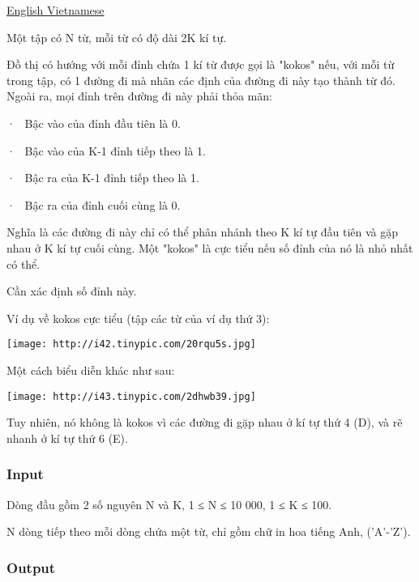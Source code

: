 



\href{/problems/show/MKOKOS/en/}{       English      }\href{/problems/show/MKOKOS/vn/}{       Vietnamese      }



   Một tập có N từ, mỗi từ có độ dài 2K kí tự.   


   Đồ thị có hướng với mỗi đỉnh chứa 1 kí từ được gọi là "kokos" nếu, với mỗi từ trong tập, có 1 đường đi mà nhãn các định của đường đi này tạo thành từ đó. Ngoài ra, mọi đỉnh trên đường đi này phải thỏa mãn:  

   ·  Bậc vào của đỉnh đầu tiên là 0.   


   ·  Bậc vào của K-1 đỉnh tiếp theo là 1.   


   ·  Bậc ra của K-1 đỉnh tiếp theo là 1.   


   ·  Bậc ra của đỉnh cuối cùng là 0.  

   Nghĩa là các đường đi này chỉ có thể phân nhánh theo K kí tự đầu tiên và gặp nhau ở K kí tự cuối cùng. Một "kokos" là cực tiểu nếu số đỉnh của nó là nhỏ nhất có thể.  

   Cần xác định số đỉnh này.   





   Ví dụ về kokos cực tiểu (tập các từ của ví dụ thứ 3):  


\texttt{[image: http://i42.tinypic.com/20rqu5s.jpg]}

   Một cách biểu diễn khác như sau:  


\texttt{[image: http://i43.tinypic.com/2dhwb39.jpg]}

   Tuy nhiên, nó không là kokos vì các đường đi gặp nhau ở kí tự thứ 4 (D), và rẽ nhanh ở kí tự thứ 6 (E).  

\subsubsection{   Input  }

   Dòng đầu gồm 2 số nguyên N và K, 1 ≤ N ≤ 10 000, 1 ≤ K ≤ 100.   


   N dòng tiếp theo mỗi dòng chứa một từ, chỉ gồm chữ in hoa tiếng Anh, ('A'-'Z').  

\subsubsection{   Output  }

